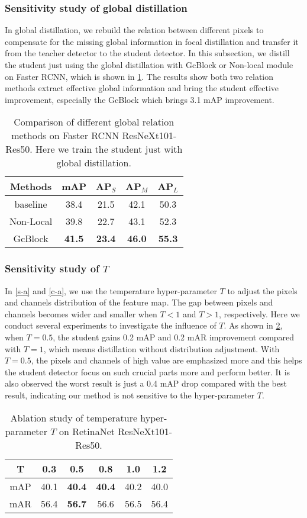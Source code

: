 \documentclass[10pt,twocolumn,letterpaper]{article}
\begin{document}
\subsubsection{Sensitivity study of global distillation}
In global distillation, we rebuild the relation between different pixels to compensate for the missing global information in focal distillation and transfer it from the teacher detector to the student detector. In this subsection, we distill the student just using the global distillation with GcBlock\cite{cao2019gcnet} or Non-local module\cite{wang2018non} on Faster RCNN, which is shown in \cref{table:relation methods}. The results show both two relation methods extract effective global information and bring the student effective improvement, especially the GcBlock which brings 3.1 mAP improvement.
\begin{table}
  \centering
  \begin{tabular}{@{}c|cccc}
    \toprule
    Methods & mAP& AP$_{S}$&AP$_{M}$&AP$_{L}$\\
    \midrule
    baseline  &38.4&21.5&42.1&50.3\\
    Non-Local  &39.8 &22.7&43.1&52.3\\
    GcBlock  &{\bf41.5}&{\bf23.4}&{\bf46.0}&{\bf55.3}\\
    \bottomrule
  \end{tabular}
  \caption{Comparison of different global relation methods on Faster RCNN ResNeXt101-Res50. Here we train the student just with global distillation.}
  \label{table:relation methods}
\end{table}

\subsubsection{Sensitivity study of  $T$}
In \cref{s-a} and \cref{c-a}, we use the temperature hyper-parameter $T$ to adjust the pixels and channels distribution of the feature map. The gap between pixels and channels becomes wider and smaller when $T<1$ and $T>1$, respectively.  Here we conduct several experiments to investigate the influence of $T$. As shown in \cref{table:T ablation}, when $T=0.5$, the student gains 0.2 mAP and 0.2 mAR improvement compared with $T=1$, which means distillation without distribution adjustment. With $T=0.5$, the pixels and channels of high value are emphasized more and this helps the student detector focus on such crucial parts more and perform better. It is also observed the worst result is just a 0.4 mAP drop compared with the best result, indicating our method is not sensitive to the hyper-parameter $T$.
\begin{table}
  \centering
  \begin{tabular}{@{}c|ccccc}
    \toprule
    T & 0.3 & 0.5 & 0.8 & 1.0 & 1.2\\
    \midrule
    mAP  &40.1&{\bf40.4}&{\bf40.4}&40.2&40.0\\
    mAR  &56.4&{\bf56.7}&56.6&56.5&56.4\\
    \bottomrule
  \end{tabular}
  \caption{Ablation study of temperature hyper-parameter $T$ on RetinaNet ResNeXt101-Res50.}
  \label{table:T ablation}
\end{table}
\end{document}
